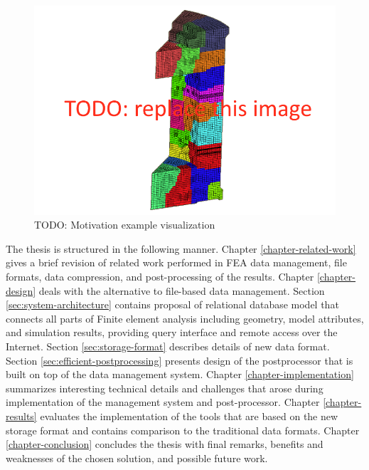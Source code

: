 \begin{figure}[H]
\centering
\includegraphics[width=\textwidth]{figures/motivation-example}
\decoRule
\caption[TODO: ]{TODO: Motivation example visualization}
\label{fig:motivation-example}
\end{figure}

The thesis is structured in the following manner. Chapter \ref{chapter-related-work} gives a brief revision of related work performed in FEA data management, file formats, data compression, and post-processing of the results. Chapter \ref{chapter-design} deals with the alternative to file-based data management. Section \ref{sec:system-architecture} contains proposal of relational database model that connects all parts of Finite element analysis including geometry, model attributes, and simulation results, providing query interface and remote access over the Internet. Section \ref{sec:storage-format} describes details of new data format. Section \ref{sec:efficient-postprocessing} presents design of the postprocessor that is built on top of the data management system. Chapter \ref{chapter-implementation} summarizes interesting technical details and challenges that arose during implementation of the management system and post-processor. Chapter \ref{chapter-results} evaluates the implementation of the tools that are based on the new storage format and contains comparison to the traditional data formats. Chapter \ref{chapter-conclusion} concludes the thesis with final remarks, benefits and weaknesses of the chosen solution, and possible future work.


